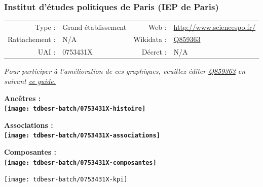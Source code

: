 \documentclass[12pt,french,]{article}
\begin{document}
\ifoddpage \fi ~\newpage  

\hypertarget{institut-duxe9tudes-politiques-de-paris-iep-de-paris}{%
\subsubsection{Institut d'études politiques de Paris (IEP de
Paris)}\label{institut-duxe9tudes-politiques-de-paris-iep-de-paris}}

\begin{tabular*}{\textwidth}{rp{5cm}rl}  
\hline  
Type : & Grand établissement & Web : &\href{http://www.sciencespo.fr/}{http://www.sciencespo.fr/} \\  
Rattachement : & N/A & Wikidata : & \href{https://www.wikidata.org/entity/Q859363}{Q859363} \\  
UAI : & 0753431X & Décret : & N/A \\  
\hline  
\end{tabular*}

\textit{\scriptsize Pour participer à l'amélioration de ces graphiques, veuillez éditer  \href{https://www.wikidata.org/entity/Q859363}{Q859363}  en suivant \href{https://github.com/cpesr/wikidataESR/blob/master/Rmd/wikidataESR.md}{ce guide.}}

\vspace{1cm}  
\begin{minipage}[b]{0.50\textwidth}\begin{center} \bf Ancêtres : \\  
\texttt{[image: tdbesr-batch/0753431X-histoire]} \end{center}\end{minipage}\begin{minipage}[b]{0.50\textwidth}\begin{center} \bf Associations : \\  
\texttt{[image: tdbesr-batch/0753431X-associations]} \end{center}\end{minipage}

\hrulefill

\begin{center} \bf Composantes : \\  
\texttt{[image: tdbesr-batch/0753431X-composantes]} \end{center}

\begin{center}\texttt{[image: tdbesr-batch/0753431X-kpi]} \end{center}\checkoddpage
\end{document}
